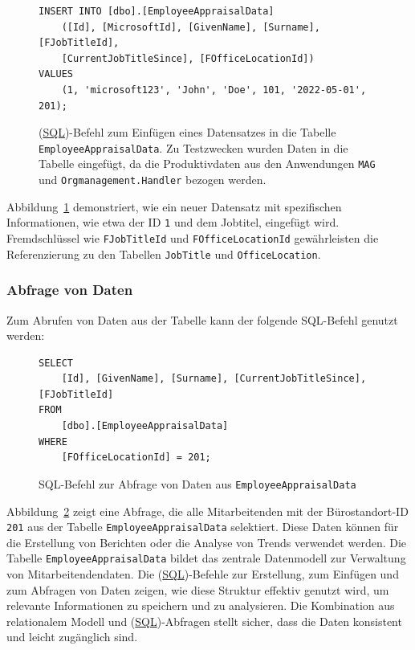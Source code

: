 \begin{figure}[H]
    \centering
    \caption{(\hyperref[abkuerzungen]{SQL})-Befehl zum Einfügen eines Datensatzes in die Tabelle \texttt{EmployeeAppraisalData}. Zu Testzwecken wurden Daten in die Tabelle eingefügt, da die Produktivdaten aus den Anwendungen \texttt{MAG} und \texttt{Orgmanagement.Handler} bezogen werden.}
    \label{fig:insert_query}
    \begin{verbatim}
INSERT INTO [dbo].[EmployeeAppraisalData] 
    ([Id], [MicrosoftId], [GivenName], [Surname], [FJobTitleId], 
    [CurrentJobTitleSince], [FOfficeLocationId])
VALUES
    (1, 'microsoft123', 'John', 'Doe', 101, '2022-05-01', 201);
    \end{verbatim}
\end{figure}


Abbildung~\ref{fig:insert_query} demonstriert, wie ein neuer Datensatz mit spezifischen Informationen, wie etwa der ID \texttt{1} und dem Jobtitel, eingefügt wird. Fremdschlüssel wie \texttt{FJobTitleId} und \texttt{FOfficeLocationId} gewährleisten die Referenzierung zu den Tabellen \texttt{JobTitle} und \texttt{OfficeLocation}.

\subsubsection*{Abfrage von Daten}
Zum Abrufen von Daten aus der Tabelle kann der folgende SQL-Befehl genutzt werden:

\begin{figure}[H]
    \centering
    \caption{SQL-Befehl zur Abfrage von Daten aus \texttt{EmployeeAppraisalData}}
    \label{fig:select_query}
    \begin{verbatim}
SELECT 
    [Id], [GivenName], [Surname], [CurrentJobTitleSince], [FJobTitleId]
FROM 
    [dbo].[EmployeeAppraisalData]
WHERE 
    [FOfficeLocationId] = 201;
    \end{verbatim}
\end{figure}

Abbildung~\ref{fig:select_query} zeigt eine Abfrage, die alle Mitarbeitenden mit der Bürostandort-ID \texttt{201} aus der Tabelle \texttt{EmployeeAppraisalData} selektiert. Diese Daten können für die Erstellung von Berichten oder die Analyse von Trends verwendet werden.
Die Tabelle \texttt{EmployeeAppraisalData} bildet das zentrale Datenmodell zur Verwaltung von Mitarbeitendendaten. Die (\hyperref[abkuerzungen]{SQL})-Befehle zur Erstellung, zum Einfügen und zum Abfragen von Daten zeigen, wie diese Struktur effektiv genutzt wird, um relevante Informationen zu speichern und zu analysieren. Die Kombination aus relationalem Modell und (\hyperref[abkuerzungen]{SQL})-Abfragen stellt sicher, dass die Daten konsistent und leicht zugänglich sind.


